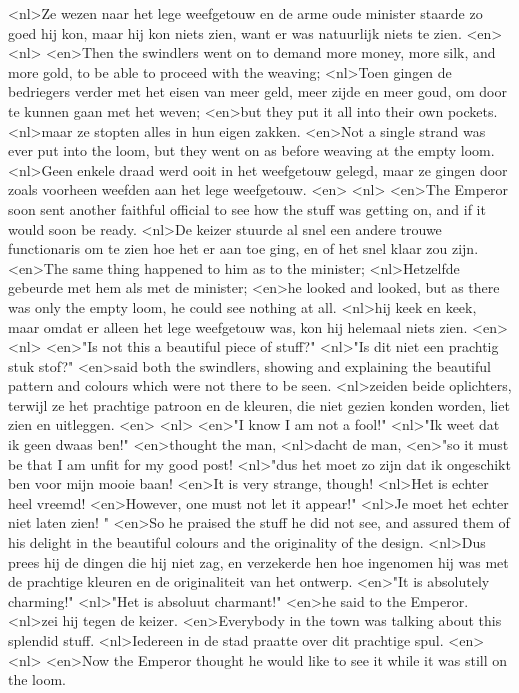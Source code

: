 <nl>Ze wezen naar het lege weefgetouw en de arme oude minister staarde zo goed hij kon, maar hij kon niets zien, want er was natuurlijk niets te zien.
<en>
<nl>
<en>Then the swindlers went on to demand more money, more silk, and more gold, to be able to proceed with the weaving;
<nl>Toen gingen de bedriegers verder met het eisen van meer geld, meer zijde en meer goud, om door te kunnen gaan met het weven;
<en>but they put it all into their own pockets.
<nl>maar ze stopten alles in hun eigen zakken.
<en>Not a single strand was ever put into the loom, but they went on as before weaving at the empty loom.
<nl>Geen  enkele draad werd ooit in het weefgetouw gelegd, maar ze gingen door zoals voorheen weefden aan het lege weefgetouw.
<en>
<nl>
<en>The Emperor soon sent another faithful official to see how the stuff was getting on, and if it would soon be ready.
<nl>De keizer stuurde al snel een andere trouwe functionaris om te zien hoe het er aan toe ging, en of het snel klaar zou zijn.
<en>The same thing happened to him as to the minister;
<nl>Hetzelfde gebeurde met hem als met de minister;
<en>he looked and looked, but as there was only the empty loom, he could see nothing at all.
<nl>hij keek en keek, maar omdat er alleen het lege weefgetouw was, kon hij helemaal niets zien.
<en>
<nl>
<en>"Is not this a beautiful piece of stuff?"
<nl>"Is dit niet een prachtig stuk stof?"
<en>said both the swindlers, showing and explaining the beautiful pattern and colours which were not there to be seen.
<nl>zeiden beide oplichters, terwijl ze het prachtige patroon en de kleuren, die niet gezien konden worden, liet zien en uitleggen.
<en>
<nl>
<en>"I know I am not a fool!"
<nl>"Ik weet dat ik geen dwaas ben!"
<en>thought the man,
<nl>dacht de man,
<en>"so it must be that I am unfit for my good post!
<nl>"dus het moet zo zijn dat ik ongeschikt ben voor mijn mooie baan!
<en>It is very strange, though!
<nl>Het is echter heel vreemd!
<en>However, one must not let it appear!"
<nl>Je moet het echter niet laten zien! "
<en>So he praised the stuff he did not see, and assured them of his delight in the beautiful colours and the originality of the design.
<nl>Dus prees hij de dingen die hij niet zag, en verzekerde hen hoe ingenomen hij was met  de prachtige kleuren en de originaliteit van het ontwerp.
<en>"It is absolutely charming!"
<nl>"Het is absoluut charmant!"
<en>he said to the Emperor.
<nl>zei hij tegen de keizer.
<en>Everybody in the town was talking about this splendid stuff.
<nl>Iedereen in de stad praatte over dit prachtige spul.
<en>
<nl>
<en>Now the Emperor thought he would like to see it while it was still on the loom.
